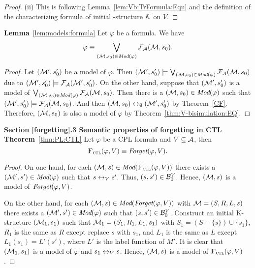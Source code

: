 \documentclass{article}
\begin{document}
\begin{proof}
 (ii) This is following Lemma~\ref{lem:Vb:TrFormula:Equ} and the definition of the characterizing formula of initial \MPK-structure ${\cal K}$ on $V$.

 \end{proof}


 \noindent\textbf{Lemma}~\ref{lem:models:formula} Let $\varphi$ be a formula. We have
   \begin{equation}
     \varphi\equiv \bigvee_{({\cal M}, s_0)\in\textit{Mod}(\varphi)}{\cal F}_{\cal A}({\cal M}, s_0).
     \end{equation}
 \begin{proof}
 Let $({\cal M}', s_0')$ be a model of $\varphi$. Then $({\cal M}', s_0') \models \bigvee_{({\cal M}, s_0)\in \textit{Mod}(\varphi)} {\cal F}_{{\cal A}}({\cal M}, s_0)$ due to $({\cal M}', s_0') \models {\cal F}_{{\cal A}}({\cal M}', s_0')$. On the other hand, suppose that $({\cal M}', s_0')$ is a model of $\bigvee_{({\cal M}, s_0)\in \textit{Mod}(\varphi)} {\cal F}_{{\cal A}}({\cal M}, s_0)$. Then there is a $({\cal M}, s_0)\in \textit{Mod}(\varphi)$ such that $({\cal M}', s_0') \models {\cal F}_{{\cal A}}({\cal M}, s_0)$. And then $({\cal M}, s_0) \leftrightarrow_{\emptyset} ({\cal M}', s_0')$ by Theorem~\ref{CF}. Therefore, $({\cal M}, s_0)$ is also a model of $\varphi$ by Theorem~\ref{thm:V-bisimulation:EQ}.
 \end{proof}



 \noindent \textbf{Section \ref{forgetting}.3 Semantic properties of forgetting in CTL}
\\

\noindent\textbf{Theorem}~\ref{thm:PL:CTL}
Let $\varphi$ be a CPL formula and $V\subseteq {\cal A}$, then
\[
{\textsc{F}_{\textsc{ctl}}}(\varphi, V) \equiv \textit{Forget}(\varphi, V).
\]
\begin{proof}
On one hand, for each $({\cal M}, s) \in \textit{Mod}({\textsc{F}_{\textsc{ctl}}}(\varphi, V))$ there exists a $({\cal M}', s') \in \textit{Mod}(\varphi)$ such that $s\leftrightarrow_V s'$. Thus, $(s, s') \in {\cal B}_0^V$. Hence, $({\cal M}, s)$ is a model of $\textit{Forget}(\varphi, V)$.

On the other hand, for each $({\cal M}, s) \in \textit{Mod}(\textit{Forget}(\varphi, V))$ with ${\cal M} = (S, R, L, s)$ there exists a $({\cal M}', s') \in \textit{Mod}(\varphi)$ such that $(s, s') \in {\cal B}_0^V$. Construct an initial K-structure $({\cal M}_1, s_1)$ such that ${\cal M}_1=(S_1, R_1, L_1, s_1)$ with $S_1= (S - \{s\}) \cup \{s_1\}$, $R_1$ is the same as $R$ except replace $s$ with $s_1$, and $L_1$ is the same as $L$ except $L_1(s_1) = L'(s')$, where $L'$ is the label function of $M'$. It is clear that $({\cal M}_1, s_1)$ is a model of $\varphi$ and $s_1 \leftrightarrow_V s$. Hence, $({\cal M}, s)$ is a model of ${\textsc{F}_{\textsc{ctl}}}(\varphi, V)$.
\end{proof}
\end{document}
